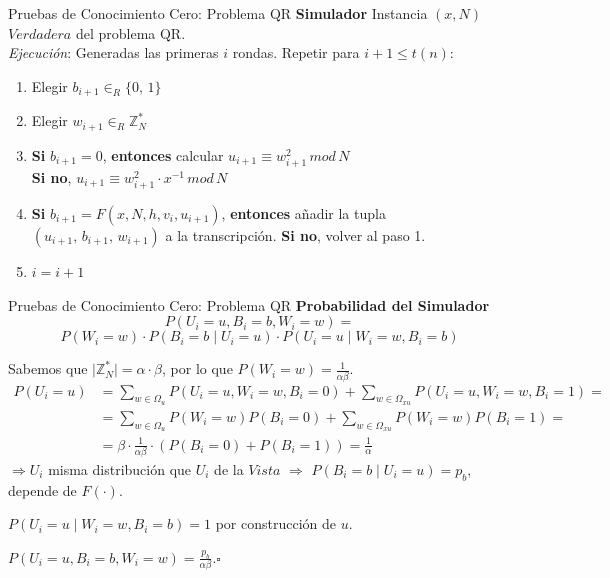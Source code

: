 \documentclass{beamer}
\begin{document}
\begin{frame}{Pruebas de Conocimiento Cero: Problema QR}
	\textbf{Simulador} Instancia $(x,N)$ $Verdadera$ del problema QR.\\
	\textit{Ejecución}: Generadas las primeras $i$ rondas. Repetir para $i+1 \leq t(n)$:
	
	\begin{enumerate}
		\item Elegir $b_{i+1} \in_R \{0,\,1\}$
		
		\item Elegir $w_{i+1} \in_R \mathbb{Z}^*_N$
		
		\item \textbf{Si} $b_{i+1} = 0$, \textbf{entonces} calcular \qquad $u_{i+1} \equiv w_{i+1}^2 \, mod \,  N$ \\
		\textbf{Si no}, \qquad \qquad \qquad \qquad \qquad \qquad \: $u_{i+1} \equiv w_{i+1}^2 \cdot x^{-1} \, mod \,  N$
		
		\item \textbf{Si} $b_{i+1} = F(x,N,h,v_i,u_{i+1})$, \textbf{entonces} añadir la tupla \\ $(u_{i+1},\,b_{i+1},\,w_{i+1})$ a la transcripción. \textbf{Si no}, volver al paso 1.
		
		\item $i = i+1$
		
	\end{enumerate}
\end{frame}


\begin{frame}{Pruebas de Conocimiento Cero: Problema QR}
	\textbf{Probabilidad del Simulador}
	{\small\[P(U_i=u, B_i=b, W_i=w) = \]
	\[P(W_i=w)\cdot P(B_i=b \mid U_i=u) \cdot P(U_i=u \mid W_i=w, B_i=b)\]}

	{\small Sabemos que $\mid \mathbb{Z}^*_N \mid = \alpha \cdot \beta $, por lo que $P(W_i=w) = \frac{1}{\alpha \beta}$.}
	{\tiny\begin{align*}
	P(U_i=u) &= \sum_{w\in \Omega_u} P(U_i=u, W_i=w, B_i = 0) + \sum_{w\in \Omega_{xu}} P(U_i=u, W_i=w, B_i = 1) =  \\
	&= \sum_{w\in \Omega_u} P(W_i=w)P(B_i = 0) + \sum_{w\in \Omega_{xu}} P(W_i=w)P(B_i = 1) = \\
	&=\beta \cdot \frac{1}{\alpha \beta} \cdot (P(B_i=0) + P(B_i=1)) = \frac{1}{\alpha}
	\end{align*}}
	{\small $\Rightarrow U_i$ misma distribución que $U_i$ de la $Vista$ $\Rightarrow$ $P(B_i=b \mid U_i=u) = p_b$, depende de $F(\cdot)$.}
	
	{\small$P(U_i=u \mid W_i=w, B_i=b) = 1$ por construcción de $u$.}
	
	$P(U_i=u, B_i=b, W_i=w) = \frac{p_b}{\alpha \beta}$.\hfil $\square$
\end{frame}
\end{document}
